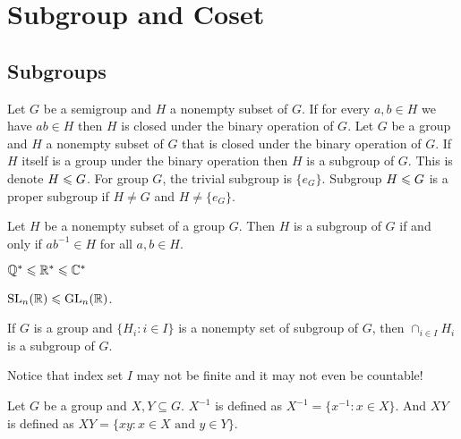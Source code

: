 \chapter{Subgroup and Coset}\label{chp:1_4}

\section{Subgroups}

\begin{definition}{}{}
    Let $G$ be a semigroup and $H$ a nonempty subset of $G$.
    If for every $a,b\in H$ we have $ab\in H$ then $H$ is closed under the binary operation of $G$.
    Let $G$ be a group and $H$ a nonempty subset of $G$ that is closed under the binary operation of $G$.
    If $H$ itself is a group under the binary operation then $H$ is a subgroup of $G$.
    This is denote $H\leqslant G$. For group $G$, 
    the trivial subgroup is $\{e_G\}$.
    Subgroup $H\leqslant G$ is a proper subgroup if $H\neq G$ and $H\neq \{e_G\}$.
\end{definition}

\begin{proposition}{}{}
    Let $H$ be a nonempty subset of a group $G$. 
    Then $H$ is a subgroup of $G$ 
    if and only if $ab^{-1} \in H$
    for all $a, b \in H$.
\end{proposition}

\begin{example}{}{}
    $\mathbb{Q}^*\leqslant \mathbb{R}^*\leqslant \mathbb{C}^*$
\end{example}

\begin{example}{}{}
    $\text{SL}_n(\mathbb{R})\leqslant \text{GL}_n(\mathbb{R})$.
\end{example}

\begin{corollary}{}{}
    If $G$ is a group and $\{H_i:i\in I\}$ is a nonempty set of subgroup of $G$,
    then $\cap_{i\in I}H_i$ is a subgroup of $G$.
\end{corollary}
\begin{remark}
    Notice that index set $I$ may not be finite and
    it may not even be countable!
\end{remark}


\begin{definition}{}{}
    Let $G$ be a group and $X,Y\subseteq G$.
    $X^{-1}$ is defined as $X^{-1}=\{x^{-1}:x\in X\}$. 
    And $XY$ is defined as $XY=\{xy:x\in X\text{ and } y\in Y\}$.
\end{definition}

